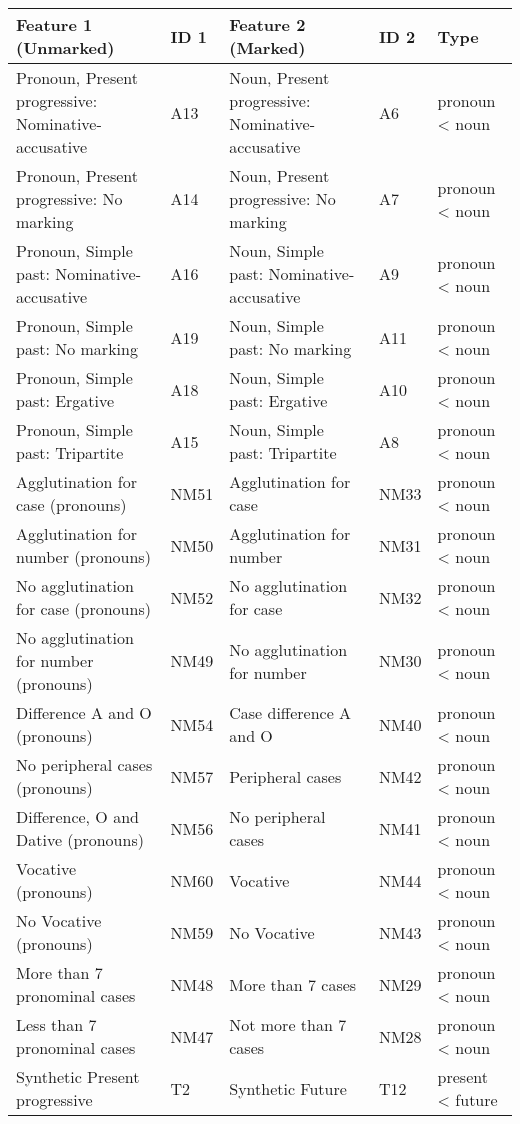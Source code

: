 \begin{longtable}{p{.3\linewidth}p{.05\linewidth}p{.3\linewidth}p{.05\linewidth}p{.2\linewidth}}
\toprule
Feature 1 (Unmarked) & ID 1 & Feature 2 (Marked) & ID 2 & Type\\
\midrule
Pronoun, Present progressive: Nominative-accusative & A13 & Noun, Present progressive: Nominative-accusative & A6 & pronoun < noun\\
Pronoun, Present progressive: No marking & A14 & Noun, Present progressive: No marking & A7 & pronoun < noun\\
Pronoun, Simple past: Nominative-accusative & A16 & Noun, Simple past: Nominative-accusative & A9 & pronoun < noun\\
Pronoun, Simple past: No marking & A19 & Noun, Simple past: No marking & A11 & pronoun < noun\\
Pronoun, Simple past: Ergative & A18 & Noun, Simple past: Ergative & A10 & pronoun < noun\\
Pronoun, Simple past: Tripartite & A15 & Noun, Simple past: Tripartite & A8 & pronoun < noun\\
Agglutination for case (pronouns) & NM51 & Agglutination for case & NM33 & pronoun < noun\\
Agglutination for number (pronouns) & NM50 & Agglutination for number & NM31 & pronoun < noun\\
No agglutination for case (pronouns) & NM52 & No agglutination for case & NM32 & pronoun < noun\\
No agglutination for number (pronouns) & NM49 & No agglutination for number & NM30 & pronoun < noun\\
Difference A and O (pronouns) & NM54 & Case difference A and O & NM40 & pronoun < noun\\
No peripheral cases (pronouns) & NM57 & Peripheral cases & NM42 & pronoun < noun\\
Difference, O and Dative (pronouns) & NM56 & No peripheral cases & NM41 & pronoun < noun\\
Vocative (pronouns) & NM60 & Vocative & NM44 & pronoun < noun\\
No Vocative (pronouns) & NM59 & No Vocative & NM43 & pronoun < noun\\
More than 7 pronominal cases & NM48 & More than 7 cases & NM29 & pronoun < noun\\
Less than 7 pronominal cases & NM47 & Not more than 7 cases & NM28 & pronoun < noun\\
Synthetic Present progressive & T2 & Synthetic Future & T12 & present < future\\

\end{longtable}
